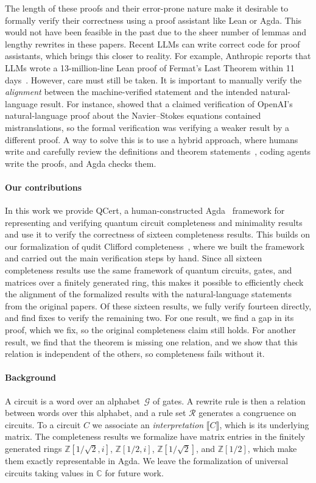 \documentclass[acmsmall,nonacm,11pt,screen]{acmart}
\newcommand{\Z}{\mathbb{Z}}
\begin{document}
The length of these proofs and their error-prone nature make it desirable to formally verify their correctness using a proof assistant like Lean or Agda. This would not have been feasible in the past due to  the sheer number of lemmas and lengthy rewrites in these papers. Recent LLMs can write correct code for proof assistants, which brings this closer to reality. For example, Anthropic reports that LLMs wrote a 13-million-line Lean proof of Fermat's Last Theorem within 11 days~\cite{anthropic2026flt}. However, care must still be taken. It is important to manually verify the \emph{alignment} between the machine-verified statement and the intended natural-language result. For instance, \cite{bastounis2026navier} showed that a claimed verification of OpenAI's natural-language proof about the Navier--Stokes equations contained mistranslations, so the formal verification was verifying a weaker result by a different proof. A way to solve this is to use a hybrid approach, where humans write and carefully review the definitions and theorem statements~\cite{hales2026reliability}, coding agents write the proofs, and Agda checks them.

\paragraph{Our contributions} In this work we provide QCert, a human-constructed Agda~\cite{norell2007thesis,bove2009agda} framework for representing and verifying quantum circuit completeness and minimality results and use it to verify the correctness of sixteen completeness results. This builds on our formalization of qudit Clifford completeness~\cite{bian2026qupit}, where we built the framework~\cite{bian2027popl} and carried out the main verification steps by hand. Since all sixteen completeness results use the same framework of quantum circuits, gates, and matrices over a finitely generated ring, this makes it possible to efficiently check the alignment of the formalized results with the natural-language statements from the original papers. Of these sixteen results, we fully verify fourteen directly, and find fixes to verify the remaining two. For one result, we find a gap in its proof, which we fix, so the original completeness claim still holds. For another result, we find that the theorem is missing one relation, and we show that this relation is independent of the others, so completeness fails without it. 

\paragraph{Background}
A circuit is a word over an alphabet~$\mathcal{G}$ of gates. A rewrite rule is then a relation between words over this alphabet, and a rule set $\mathcal{R}$ generates a congruence on circuits. To a circuit $C$ we associate an \emph{interpretation} $\llbracket C \rrbracket$, which is its underlying matrix. The completeness results we formalize have matrix entries in the finitely generated rings $\Z\left[1/\sqrt2,i\right]$, $\Z\left[1/2,i\right]$, $\Z\left[1/\sqrt2\right]$, and $\Z\left[1/2\right]$, which make them exactly representable in Agda. We leave the formalization of universal circuits taking values in $\mathbb{C}$ for future work.
\end{document}
